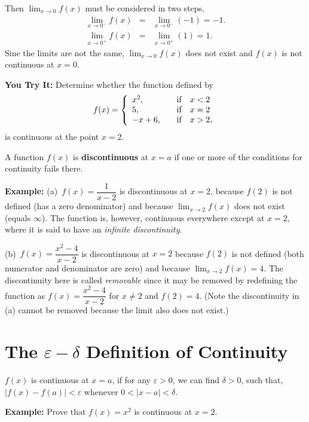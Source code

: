 \documentclass[titlepage,a4paper,12pt]{report}
\begin{document}
 Then $\displaystyle \lim _{x\rightarrow 0} f(x)$ must be considered in two steps, 
 \begin{eqnarray*}
 \lim _{x\rightarrow 0^-}f(x) &=& \lim _{x\rightarrow 0^-} (-1) = -1.\\
 \lim _{x\rightarrow 0^+}f(x) &=& \lim _{x\rightarrow 0^+} (1) = 1.
 \end{eqnarray*}
 Sine the limits are not the same, $\displaystyle \lim _{x\rightarrow 0} f(x)$ does not exist and $f(x)$ is not continuous at $x=0$.
 
 \noindent \textbf{You Try It:} Determine whether the function defined by 
 \[ f(x) = \left\{ 
\begin{array}{l l}
  x^2, & \quad \hbox{if}~~~ x<2 \\
  5, & \quad \hbox{if}~~~x=2\\
 -x+6, & \quad \hbox{if}~~~ x>2,\\ \end{array} \right. \]
 is continuous at the point $x=2$.
 
 
\noindent A function $f(x)$ is \textbf{discontinuous} at $x=a$ if one or more of the conditions for continuity fails there.
 
 \noindent \textbf{Example:} (a)\, $f(x)=\dfrac{1}{x-2}$ is discontinuous at $x=2$, because $f(2)$ is not defined (has a zero denominator) and because $\displaystyle \lim _{x\rightarrow 2}f(x)$ does not exist (equals $\infty$). The function is, however, continuous everywhere except at $x=2$, where it is said to have an \textit{infinite discontinuity}. 
 
 \noindent (b)\, $f(x)=\dfrac{x^2-4}{x-2}$ is discontinuous at $x=2$ because $f(2)$ is not defined (both numerator and denominator are zero) and because $\displaystyle \lim _{x\rightarrow 2}f(x)=4$. The discontinuity here is called \textit{removable} since it may be removed by redefining the function as $f(x)=\dfrac{x^2-4}{x-2}$ for $x\neq 2$ and $f(2)=4$. (Note the discontinuity in (a) cannot be removed because the limit also does not exist.)
 
 \section{The $\varepsilon - \delta$ Definition of Continuity}
 $f(x)$ is continuous at $x=a$, if for any $\varepsilon >0$, we can find $\delta >0$, such that, $|f(x)-f(a)|<\varepsilon$ whenever $0<|x-a|<\delta$.
 
 \noindent \textbf{Example:} Prove that $f(x)=x^2$ is continuous at $x=2$.
 
\end{document}
